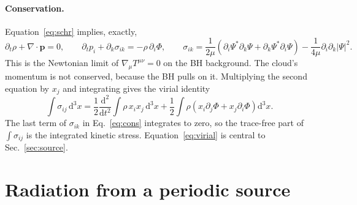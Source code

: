 \documentclass[11pt]{article}
\newcommand{\dd}{\mathrm{d}}
\newcommand{\bp}{\mathbf p}
\begin{document}
\paragraph{Conservation.} Equation~\eqref{eq:schr} implies, exactly,
\begin{equation}
\partial_t\rho+\nabla\cdot\bp=0,\qquad
\partial_tp_i+\partial_k\sigma_{ik}=-\rho\,\partial_i\Phi,\qquad
\sigma_{ik}=\frac1{2\mu}\left(\partial_i\Psi^*\partial_k\Psi+\partial_k\Psi^*\partial_i\Psi\right)-\frac1{4\mu}\partial_i\partial_k|\Psi|^2 .
\label{eq:cons}
\end{equation}
This is the Newtonian limit of $\nabla_\mu T^{\mu\nu}=0$ on the BH background. The cloud's momentum is not conserved, because the BH pulls on it. Multiplying the second equation by $x_j$ and integrating gives the virial identity
\begin{equation}
\int\sigma_{ij}\,\dd^3x=\frac12\frac{\dd^2}{\dd t^2}\int\rho\,x_ix_j\,\dd^3x+\frac12\int\rho\left(x_i\partial_j\Phi+x_j\partial_i\Phi\right)\dd^3x .
\label{eq:virial}
\end{equation}
The last term of $\sigma_{ik}$ in Eq.~\eqref{eq:cons} integrates to zero, so the trace-free part of $\int\sigma_{ij}$ is the integrated kinetic stress. Equation~\eqref{eq:virial} is central to Sec.~\ref{sec:source}.

\section{Radiation from a periodic source}
\label{sec:rad}
\end{document}
